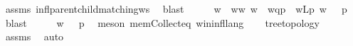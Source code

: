 \begin{isabellebody}
\ assms{\isacharparenleft}{\kern0pt}{}{\isacharparenright}{\kern0pt}\ infl{\isacharunderscore}{\kern0pt}parent{\isacharunderscore}{\kern0pt}child{\isacharunderscore}{\kern0pt}matching{\isacharunderscore}{\kern0pt}ws\ \isamarkupfalse%
\ blast\isanewline
\ \ \isamarkupfalse%
\ \isamarkupfalse%
\ w{\isacharprime}{\kern0pt}\ \ w{\isacharprime}{\kern0pt}{\isacharunderscore}{\kern0pt}w{\isacharcolon}{\kern0pt}\ {\isachardoublequoteopen}{\isacharparenleft}{\kern0pt}{\isacharparenleft}{\kern0pt}w{\isasymdown}\isactrlsub {\isacharquery}{\kern0pt}{\isacharparenright}{\kern0pt}{\isasymdown}\isactrlsub {\isacharbang}{\kern0pt}\isactrlsub {\isacharquery}{\kern0pt}{\isacharparenright}{\kern0pt}\ {\isacharequal}{\kern0pt}\ {\isacharparenleft}{\kern0pt}{\isacharparenleft}{\kern0pt}{\isacharparenleft}{\kern0pt}w{\isacharprime}{\kern0pt}{\isasymdown}\isactrlsub {\isacharbraceleft}{\kern0pt}\isactrlsub q\isactrlsub {\isacharcomma}{\kern0pt}\isactrlsub p\isactrlsub {\isacharbraceright}{\kern0pt}{\isacharparenright}{\kern0pt}{\isasymdown}\isactrlsub {\isacharbang}{\kern0pt}{\isacharparenright}{\kern0pt}{\isasymdown}\isactrlsub {\isacharbang}{\kern0pt}\isactrlsub {\isacharquery}{\kern0pt}{\isacharparenright}{\kern0pt}{\isachardoublequoteclose}\ \ w{\isacharprime}{\kern0pt}{\isacharunderscore}{\kern0pt}Lp{\isacharcolon}{\kern0pt}\ {\isachardoublequoteopen}w{\isacharprime}{\kern0pt}\ {\isasymin}\ {\isasymL}\isactrlsup {\isacharasterisk}{\kern0pt}\ p{\isachardoublequoteclose}\ \isamarkupfalse%
\ blast\isanewline
\ \ \isamarkupfalse%
\ \isamarkupfalse%
\ {\isachardoublequoteopen}w{\isacharprime}{\kern0pt}\ {\isasymin}\ {\isasymL}\ p{\isachardoublequoteclose}\ \isamarkupfalse%
\ {\isacharparenleft}{\kern0pt}meson\ mem{\isacharunderscore}{\kern0pt}Collect{\isacharunderscore}{\kern0pt}eq\ w{\isacharunderscore}{\kern0pt}in{\isacharunderscore}{\kern0pt}infl{\isacharunderscore}{\kern0pt}lang{\isacharparenright}{\kern0pt}\isanewline
\ \ \isamarkupfalse%
\ {\isachardoublequoteopen}tree{\isacharunderscore}{\kern0pt}topology{\isachardoublequoteclose}\ \ \isamarkupfalse%
\ assms{\isacharparenleft}{\kern0pt}{}{\isacharparenright}{\kern0pt}\ \isamarkupfalse%
\ auto\isanewline
\ \ \isamarkupfalse%

\end{isabellebody}
